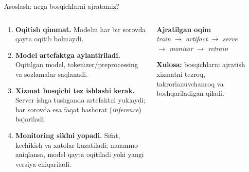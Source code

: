 \documentclass[aspectratio=169,11pt]{beamer}
\newcommand{\uzq}{\textquotesingle{}}   %
\begin{document}
\begin{frame}{Asoslash: nega bosqichlarni ajratamiz?}
  \small

  \begin{columns}[T,totalwidth=\textwidth]
    \begin{column}{0.58\textwidth}
      \begin{enumerate}\setlength\itemsep{5pt}
        \item \textbf{O\uzq{}qitish qimmat.}
        Modelni har bir so\uzq{}rovda qayta o\uzq{}qitib bo\uzq{}lmaydi.

        \item \textbf{Model artefaktga aylantiriladi.}
        O\uzq{}qitilgan model, tokenizer/preprocessing va sozlamalar saqlanadi.

        \item \textbf{Xizmat bosqichi tez ishlashi kerak.}
        Server ishga tushganda artefaktni yuklaydi; har so\uzq{}rovda esa faqat
        bashorat (\textit{inference}) bajariladi.

        \item \textbf{Monitoring siklni yopadi.}
        Sifat, kechikish va xatolar kuzatiladi; muammo aniqlansa, model qayta
        o\uzq{}qitiladi yoki yangi versiya chiqariladi.
      \end{enumerate}
    \end{column}

    \begin{column}{0.39\textwidth}
      \begin{tcolorbox}[defbox,top=2pt,bottom=2pt]
        \footnotesize
        \centering
        \textbf{Ajratilgan oqim}\\[3pt]
        \textit{train}
        $\rightarrow$
        \textit{artifact}
        $\rightarrow$
        \textit{serve}\\[2pt]
        $\rightarrow$
        \textit{monitor}
        $\rightarrow$
        \textit{retrain}
      \end{tcolorbox}

      \vspace{4pt}

      \begin{tcolorbox}[okbox,top=2pt,bottom=2pt]
        \footnotesize
        \textbf{Xulosa:}
        bosqichlarni ajratish xizmatni tezroq, takrorlanuvchanroq va
        boshqariladigan qiladi.
      \end{tcolorbox}
    \end{column}
  \end{columns}
\end{frame}
\end{document}
